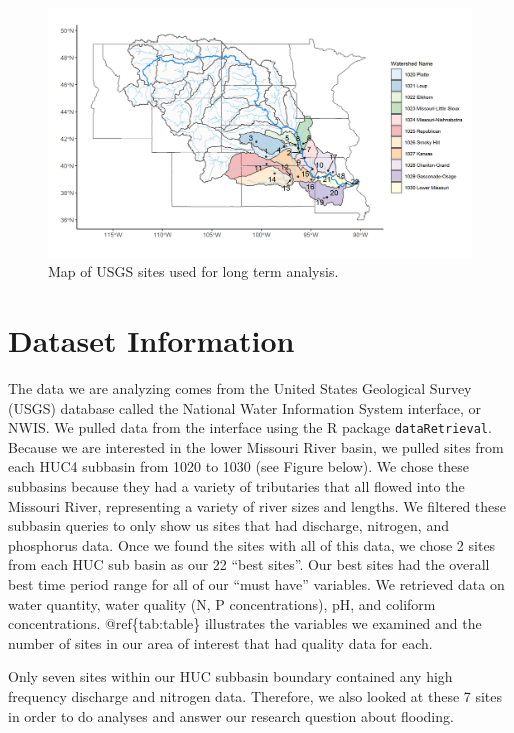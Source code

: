 \documentclass[12pt,]{article}
\makeatletter
\def\maxwidth{\ifdim\Gin@nat@width>\linewidth\linewidth\else\Gin@nat@width\fi}
\makeatother
\begin{document}
\begin{figure}
\includegraphics[width=\maxwidth]{../../Figures/site_map} \caption{\label{fig:sitemap} Map of USGS sites used for long term analysis.}\label{fig:sitemap}
\end{figure}

\newpage

\hypertarget{dataset-information}{%
\section{Dataset Information}\label{dataset-information}}

The data we are analyzing comes from the United States Geological Survey
(USGS) database called the National Water Information System interface,
or NWIS. We pulled data from the interface using the R package
\texttt{dataRetrieval}. Because we are interested in the lower Missouri
River basin, we pulled sites from each HUC4 subbasin from 1020 to 1030
(see Figure below). We chose these subbasins because they had a variety
of tributaries that all flowed into the Missouri River, representing a
variety of river sizes and lengths. We filtered these subbasin queries
to only show us sites that had discharge, nitrogen, and phosphorus data.
Once we found the sites with all of this data, we chose 2 sites from
each HUC sub basin as our 22 ``best sites''. Our best sites had the
overall best time period range for all of our ``must have'' variables.
We retrieved data on water quantity, water quality (N, P
concentrations), pH, and coliform concentrations. @ref\{tab:table\}
illustrates the variables we examined and the number of sites in our
area of interest that had quality data for each.

Only seven sites within our HUC subbasin boundary contained any high
frequency discharge and nitrogen data. Therefore, we also looked at
these 7 sites in order to do analyses and answer our research question
about flooding.
\end{document}
